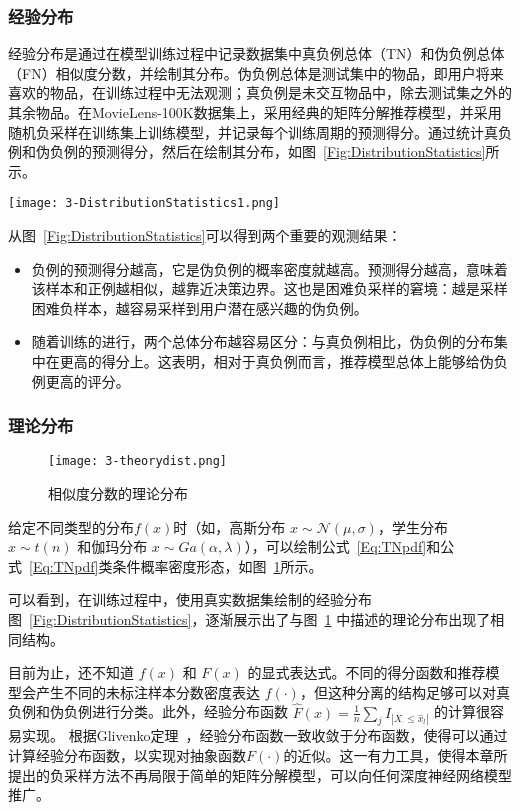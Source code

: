 \subsubsection{经验分布}\label{Appendix:Realdist}
经验分布是通过在模型训练过程中记录数据集中真负例总体（TN）和伪负例总体（FN）相似度分数，并绘制其分布。伪负例总体是测试集中的物品，即用户将来喜欢的物品，在训练过程中无法观测；真负例是未交互物品中，除去测试集之外的其余物品。在MovieLens-100K数据集上，采用经典的矩阵分解推荐模型，并采用随机负采样在训练集上训练模型，并记录每个训练周期的预测得分。通过统计真负例和伪负例的预测得分，然后在绘制其分布，如图~\ref{Fig:DistributionStatistics}所示。
\begin{figure*}[h!]
	\centering
	\texttt{[image: 3-DistributionStatistics1.png]}
	\caption{不同训练时点的相似度分数的经验分布}
	\label{Fig:DistributionStatistics}
\end{figure*}
\par
从图~\ref{Fig:DistributionStatistics}可以得到两个重要的观测结果：
\begin{itemize}
\item 负例的预测得分越高，它是伪负例的概率密度就越高。预测得分越高，意味着该样本和正例越相似，越靠近决策边界。这也是困难负采样的窘境：越是采样困难负样本，越容易采样到用户潜在感兴趣的伪负例。
\item 随着训练的进行，两个总体分布越容易区分：与真负例相比，伪负例的分布集中在更高的得分上。这表明，相对于真负例而言，推荐模型总体上能够给伪负例更高的评分。
\end{itemize}

\subsubsection{理论分布}\label{Appendix:Theodist}
\begin{figure}[h!]
	\centering
	\texttt{[image: 3-theorydist.png]}
	\caption{相似度分数的理论分布}
	\label{Fig:TheoryDist}
\end{figure}
给定不同类型的分布$f(x)$时（如，高斯分布 $x\sim \mathcal{N}(\mu,\sigma)$，学生分布 $x\sim t(n)$ 和伽玛分布 $x\sim Ga(\alpha,\lambda)$），可以绘制公式~\eqref{Eq:TNpdf}和公式~\eqref{Eq:TNpdf}类条件概率密度形态，如图~\ref{Fig:TheoryDist}所示。

可以看到，在训练过程中，使用真实数据集绘制的经验分布图~\ref{Fig:DistributionStatistics}，逐渐展示出了与图~\ref{Fig:TheoryDist} 中描述的理论分布出现了相同结构。

目前为止，还不知道 $f(x)$ 和 $F(x)$ 的显式表达式。不同的得分函数和推荐模型会产生不同的未标注样本分数密度表达 $f(\cdot)$，但这种分离的结构足够可以对真负例和伪负例进行分类。此外，经验分布函数 $\hat F(x)= \frac{1}{n}\sum_j I_{|X_\cdot \leq \hat{x}_l|}$ 的计算很容易实现。 根据Glivenko定理~\cite{glivenko:1933}，经验分布函数一致收敛于分布函数，使得可以通过计算经验分布函数，以实现对抽象函数$F(\cdot)$的近似。这一有力工具，使得本章所提出的负采样方法不再局限于简单的矩阵分解模型，可以向任何深度神经网络模型推广。

